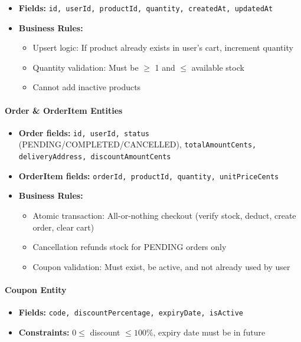 \documentclass[11pt,a4paper]{article}
\begin{document}
\begin{itemize}
    \item \textbf{Fields:} \texttt{id, userId, productId, quantity, createdAt, updatedAt}
    \item \textbf{Business Rules:}
    \begin{itemize}
        \item Upsert logic: If product already exists in user's cart, increment quantity
        \item Quantity validation: Must be $\geq$ 1 and $\leq$ available stock
        \item Cannot add inactive products
    \end{itemize}
\end{itemize}

\paragraph{Order \& OrderItem Entities}

\begin{itemize}
    \item \textbf{Order fields:} \texttt{id, userId, status} (PENDING/COMPLETED/CANCELLED), \texttt{totalAmountCents, deliveryAddress, discountAmountCents}
    \item \textbf{OrderItem fields:} \texttt{orderId, productId, quantity, unitPriceCents}
    \item \textbf{Business Rules:}
    \begin{itemize}
        \item Atomic transaction: All-or-nothing checkout (verify stock, deduct, create order, clear cart)
        \item Cancellation refunds stock for PENDING orders only
        \item Coupon validation: Must exist, be active, and not already used by user
    \end{itemize}
\end{itemize}

\paragraph{Coupon Entity}

\begin{itemize}
    \item \textbf{Fields:} \texttt{code, discountPercentage, expiryDate, isActive}
    \item \textbf{Constraints:} $0 \leq$ discount $\leq 100\%$, expiry date must be in future
\end{itemize}
\end{document}
